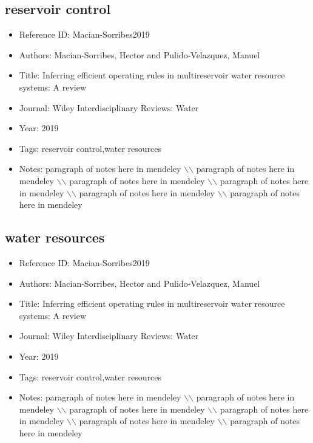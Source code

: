 \documentclass[11pt]{article}
\begin{document}
\subsection{reservoir control} 
\noindent\citep{Macian-Sorribes2019} 
\begin{itemize} 
\item{Reference ID:  Macian-Sorribes2019} 

\item{Authors:  Macian-Sorribes, Hector and Pulido-Velazquez, Manuel} 

\item{Title:  Inferring efficient operating rules in multireservoir water resource systems: A review} 

\item{Journal:  Wiley Interdisciplinary Reviews: Water} 

\item{Year:  2019} 

\item{Tags:  reservoir control,water resources} 

\item{Notes:  paragraph of notes here in mendeley $\backslash$$\backslash$ paragraph of notes here in mendeley $\backslash$$\backslash$ paragraph of notes here in mendeley $\backslash$$\backslash$ paragraph of notes here in mendeley $\backslash$$\backslash$ paragraph of notes here in mendeley $\backslash$$\backslash$ paragraph of notes here in mendeley} 

\end{itemize}\medskip



\subsection{water resources} 
\noindent\citep{Macian-Sorribes2019} 
\begin{itemize} 
\item{Reference ID:  Macian-Sorribes2019} 

\item{Authors:  Macian-Sorribes, Hector and Pulido-Velazquez, Manuel} 

\item{Title:  Inferring efficient operating rules in multireservoir water resource systems: A review} 

\item{Journal:  Wiley Interdisciplinary Reviews: Water} 

\item{Year:  2019} 

\item{Tags:  reservoir control,water resources} 

\item{Notes:  paragraph of notes here in mendeley $\backslash$$\backslash$ paragraph of notes here in mendeley $\backslash$$\backslash$ paragraph of notes here in mendeley $\backslash$$\backslash$ paragraph of notes here in mendeley $\backslash$$\backslash$ paragraph of notes here in mendeley $\backslash$$\backslash$ paragraph of notes here in mendeley} 

\end{itemize}\medskip
\end{document}
